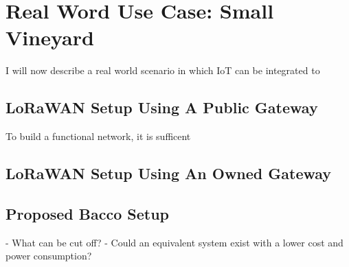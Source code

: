 \section{Real Word Use Case: Small Vineyard}
I will now describe a real world scenario in which \gls{IoT} can be integrated to 

\subsection{LoRaWAN Setup Using A Public Gateway}
To build a functional network, it is sufficent


\subsection{LoRaWAN Setup Using An Owned Gateway}

\subsection{Proposed Bacco Setup}
- What can be cut off?
- Could an equivalent system exist with a lower cost and power consumption?

